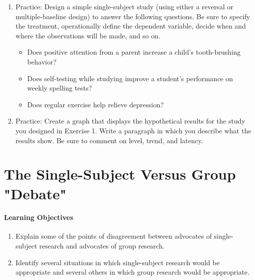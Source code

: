 \begin{fullwidth}

\begin{enumerate}

\item  Practice: Design a simple single-subject study (using either a reversal or multiple-baseline design) to answer the following questions. Be sure to specify the treatment, operationally define the dependent variable, decide when and where the observations will be made, and so on.

 \begin{itemize}

 \item Does positive attention from a parent increase a child's tooth-brushing behavior?


\item Does self-testing while studying improve a student's performance on weekly spelling
tests?


\item Does regular exercise help relieve depression?

 \end{itemize}


\item Practice: Create a graph that displays the hypothetical results for the study you designed in Exercise 1. Write a paragraph in which you describe what the results show. Be sure to comment on level, trend, and latency.


\end{enumerate}

\end{fullwidth}

 \newpage
   \section{The Single-Subject Versus Group "Debate"}

   \paragraph{Learning Objectives}
    \begin{enumerate}
    \item   Explain some of the points of disagreement between advocates of single-subject research and advocates of group research.
     \item Identify several situations in which single-subject research would be appropriate and several others in which group research would be appropriate.
      \end{enumerate}


